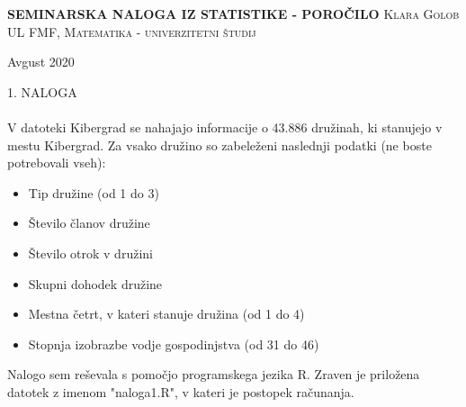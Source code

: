 \documentclass[a4paper]{article}
\begin{document}
\begin{titlepage}
    \centering
    \vfill
    \vfill
    \textbf{\large{SEMINARSKA NALOGA IZ STATISTIKE - POROČILO}}
    \vfill
    \textsc{\Large{Klara Golob}}
    \vfill\vfill
    \textsc{\large{UL FMF, Matematika - univerzitetni študij}}
    
     \vfill
    \large{Avgust 2020}
    
\end{titlepage}


\newpage


\large{1. NALOGA}
\\
\\
V datoteki Kibergrad se nahajajo informacije o 43.886 družinah, ki stanujejo v mestu Kibergrad. Za vsako družino so zabeleženi naslednji podatki (ne boste potrebovali vseh):
\begin{itemize}
\item Tip družine (od 1 do 3)
\item Število članov družine
\item Število otrok v družini
\item Skupni dohodek družine
\item Mestna četrt, v kateri stanuje družina (od 1 do 4)
\item Stopnja izobrazbe vodje gospodinjstva (od 31 do 46)
\end{itemize}
Nalogo sem reševala s pomočjo programskega jezika R. Zraven je priložena datotek z imenom "naloga1.R", v kateri je postopek računanja.
\end{document}

